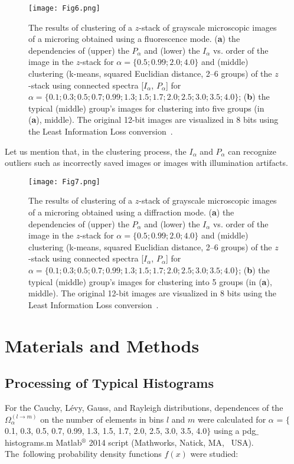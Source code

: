 \documentclass[entropy,article,accept,moreauthors,pdftex,10pt,a4paper]{mdpi}
\begin{document}
\begin{figure}[H]
\centering
\texttt{[image: Fig6.png]}
\caption[]{{The results of clustering of a} $z$-stack of grayscale microscopic images of a microring obtained using a fluorescence mode. (\textbf{a}) the dependencies of ({upper}) the $P_\alpha$ and ({lower}) the $I_\alpha$ vs. order of the image in the $z$-stack for $\alpha = \{0.5; 0.99; 2.0; 4.0\}$ and ({middle}) clustering (k-means, squared Euclidian distance, 2--6 groups) of the $z$-stack using connected spectra [$I_\alpha$, $P_\alpha$] for \mbox{$\alpha = \{0.1; 0.3; 0.5; 0.7; 0.99; 1.3; 1.5; 1.7; 2.0; 2.5; 3.0; 3.5; 4.0\}$;} (\textbf{b}) the typical (middle) group's images for clustering into five groups (in (\textbf{a}), {middle}). The original 12-bit images are visualized in 8 bits using the Least Information Loss conversion~\cite{Sty16}.}
\label{Fig6}
\end{figure}

Let us mention that, in the clustering process, the $I_\alpha$ and $P_\alpha$ can recognize outliers such as  incorrectly saved images or images with illumination artifacts.
\begin{figure}[H]
\centering
\texttt{[image: Fig7.png]}
\caption[]{{The results of clustering of a} $z$-stack of grayscale microscopic images of a microring obtained using a diffraction mode. (\textbf{a}) the dependencies of ({upper}) the $P_\alpha$ and ({lower}) the $I_\alpha$ vs. order of the image in the $z$-stack for $\alpha = \{0.5; 0.99; 2.0; 4.0\}$ and ({middle}) clustering (k-means, squared Euclidian distance, 2--6 groups) of the $z$-stack using connected spectra [$I_\alpha$, $P_\alpha$] for $\alpha = \{0.1; 0.3; 0.5; 0.7; 0.99; 1.3; 1.5; 1.7; 2.0; 2.5; 3.0; 3.5; 4.0\}$; (\textbf{b}) the typical (middle) group's images for clustering into 5 groups (in (\textbf{a}), {middle}). The original 12-bit images are visualized in 8 bits using the Least Information Loss conversion~\cite{Sty16}.}
\label{Fig7}
\end{figure}



\section{Materials and Methods}\label{sec.4}
\label{methods}
\unskip
\subsection{Processing of Typical Histograms}
\label{hist_process}
For the Cauchy, L\'{e}vy, Gauss, and Rayleigh distributions, dependences of the $\Omega_{\alpha}^{(l \rightarrow m)}$ on the number of elements in bins $l$ and $m$ were calculated for $\alpha$ = $\{$0.1, 0.3, 0.5, 0.7, 0.99, 1.3, 1.5, 1.7, 2.0, 2.5, 3.0, 3.5, 4.0$\}$ using a pdg$\_$histograms.m {Matlab$^\circledR$ 2014 script} ({Mathworks, Natick, MA,} ~USA). The~following probability density functions $f(x)$ were studied:
\end{document}
